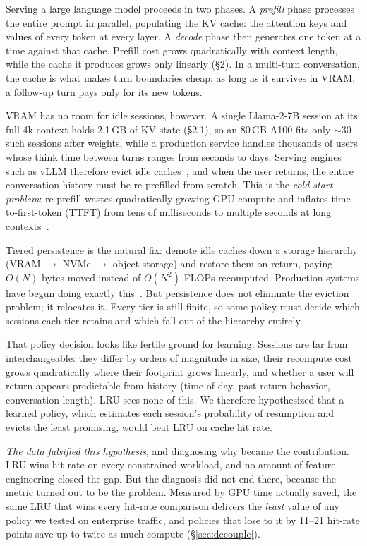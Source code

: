 \documentclass[letterpaper,twocolumn,10pt]{article}
\begin{document}
Serving a large language model proceeds in two phases. A \emph{prefill} phase processes the entire prompt in parallel, populating the KV cache: the attention keys and values of every token at every layer. A \emph{decode} phase then generates one token at a time against that cache. Prefill cost grows quadratically with context length, while the cache it produces grows only linearly (\S2). In a multi-turn conversation, the cache is what makes turn boundaries cheap: as long as it survives in VRAM, a follow-up turn pays only for its new tokens.

VRAM has no room for idle sessions, however. A single Llama-2-7B session at its full 4k context holds 2.1\,GB of KV state (\S2.1), so an 80\,GB A100 fits only ${\sim}30$ such sessions after weights, while a production service handles thousands of users whose think time between turns ranges from seconds to days. Serving engines such as vLLM therefore evict idle caches~\cite{kwon2023pagedattention}, and when the user returns, the entire conversation history must be re-prefilled from scratch. This is the \emph{cold-start problem}: re-prefill wastes quadratically growing GPU compute and inflates time-to-first-token (TTFT) from tens of milliseconds to multiple seconds at long contexts~\cite{liu2024cachegen}.

Tiered persistence is the natural fix: demote idle caches down a storage hierarchy (VRAM $\to$ NVMe $\to$ object storage) and restore them on return, paying $O(N)$ bytes moved instead of $O(N^2)$ FLOPs recomputed. Production systems have begun doing exactly this~\cite{gao2024cachedattention,qin2025mooncake,zhong2024lmcache}. But persistence does not eliminate the eviction problem; it relocates it. Every tier is still finite, so some policy must decide which sessions each tier retains and which fall out of the hierarchy entirely.

That policy decision looks like fertile ground for learning. Sessions are far from interchangeable: they differ by orders of magnitude in size, their recompute cost grows quadratically where their footprint grows linearly, and whether a user will return appears predictable from history (time of day, past return behavior, conversation length). LRU sees none of this. We therefore hypothesized that a learned policy, which estimates each session's probability of resumption and evicts the least promising, would beat LRU on cache hit rate.

\emph{The data falsified this hypothesis}, and diagnosing why became the contribution. LRU wins hit rate on every constrained workload, and no amount of feature engineering closed the gap. But the diagnosis did not end there, because the metric turned out to be the problem. Measured by GPU time actually saved, the same LRU that wins every hit-rate comparison delivers the \emph{least} value of any policy we tested on enterprise traffic, and policies that lose to it by 11--21 hit-rate points save up to twice as much compute (\S\ref{sec:decouple}).
\end{document}
